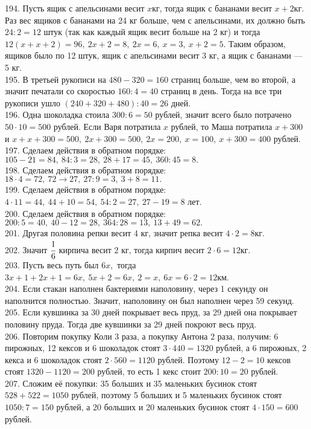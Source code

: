 194. Пусть ящик с апельсинами весит $x$кг, тогда ящик с бананами весит $x+2$кг. Раз вес ящиков с бананами на 24 кг больше, чем с апельсинами, их должно быть $24:2=12$ штук (так как каждый ящик весит больше на 2 кг) и тогда $12(x+x+2)=96,\ 2x+2=8,\ 2x=6,\ x=3,\ x+2=5.$ Таким образом, ящиков было по 12 штук, ящик с апельсинами весит 3 кг, а ящик с бананами --- 5 кг.\\
195. В третьей рукописи на $480-320=160$ страниц больше, чем во второй, а значит печатали со скоростью $160:4=40$ страниц в день. Тогда на все три рукописи ушло $(240+320+480):40=26$ дней.\\
196. Одна шоколадка стоила $300:6=50$ рублей, значит всего было потрачено $50\cdot10=500$ рублей. Если Варя потратила $x$ рублей, то Маша потратила $x+300$ и $x+x+300=500,\ 2x+300=500,\ 2x=200,\ x=100,\ x+300=400$ рублей.\\
197. Сделаем действия в обратном порядке: $105-21=84,\ 84:3=28,\ 28+17=45,\ 360:45=8.$\\
198. Сделаем действия в обратном порядке: $18\cdot4=72,\ 72\rightarrow27,\ 27:9=3,\ 3+8=11.$\\
199. Сделаем действия в обратном порядке: $4\cdot11=44,\ 44+10=54,\ 54:2=27,\ 27-19=8$ лет.\\
200. Сделаем действия в обратном порядке: $200:5=40,\ 40-12=28,\ 364:28=13,\ 13+49=62.$\\
201. Другая половина репки весит 4 кг, значит репка весит $4\cdot2=8$кг.\\
202. Значит $\cfrac{1}{6}$ кирпича весит 2 кг, тогда кирпич весит $2\cdot6=12$кг.\\
203. Пусть весь путь был $6x,$ тогда $3x+1+2x+1=6x,\ 5x+2=6x,\ 2=x,\ 6x=6\cdot2=12$км.\\
204. Если стакан наполнен бактериями наполовину, через 1 секунду он наполнится полностью. Значит, наполовину он был наполнен через 59 секунд.\\
205. Если кувшинка за 30 дней покрывает весь пруд, за 29 дней она покрывает половину пруда. Тогда две кувшинки за 29 дней покроют весь пруд.\\
206. Повторим покупку Коли 3 раза, а покупку Антона 2 раза, получим: 6 пирожных, 12 кексов и 6 шоколадок стоят $3\cdot440=1320$ рублей, а 6 пирожных, 2 кекса и 6 шоколадок стоят $2\cdot560=1120$ рублей. Поэтому $12-2=10$ кексов стоят $1320-1120=200$ рублей, то есть 1 кекс стоит $200:10=20$ рублей.\\
207. Сложим её покупки: 35 больших и 35 маленьких бусинок стоят $528+522=1050$ рублей, поэтому 5 больших и 5 маленьких бусинок стоят $1050:7=150$ рублей, а 20 больших и 20 маленьких бусинок стоят $4\cdot150=600$ рублей.\\
